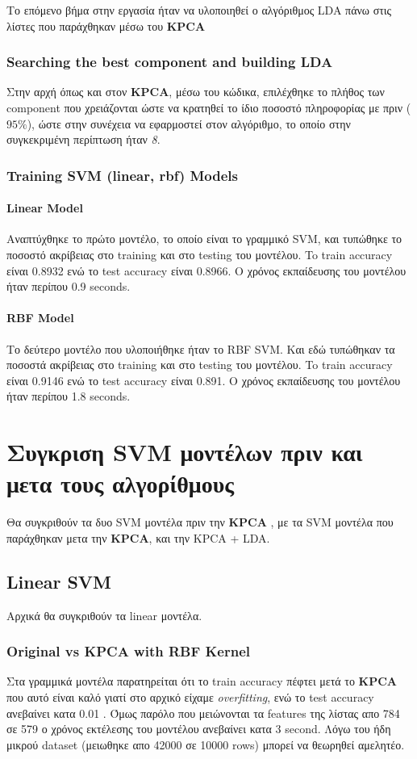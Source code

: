 Το επόμενο βήμα στην εργασία ήταν να υλοποιηθεί ο αλγόριθμος LDA πάνω στις λίστες που παράχθηκαν μέσω του \textbf{KPCA}
\subsubsection{Searching the best component  and building LDA  }

Στην αρχή όπως και στον \textbf{KPCA}, μέσω του κώδικα, επιλέχθηκε το πλήθος των component που χρειάζονται ώστε να κρατηθεί το ίδιο ποσοστό πληροφορίας με πριν ($95\%$), ώστε στην συνέχεια να εφαρμοστεί στον αλγόριθμο, το οποίο στην συγκεκριμένη περίπτωση ήταν \emph{8}.

\subsubsection{Training SVM (linear, rbf) Models}

\paragraph{Linear Model}

Αναπτύχθηκε το πρώτο μοντέλο, το οποίο είναι το γραμμικό SVM, και
τυπώθηκε το ποσοστό ακρίβειας στο training και στο testing του μοντέλου. To train accuracy είναι 0.8932 ενώ το test
accuracy είναι 0.8966. Ο χρόνος εκπαίδευσης του μοντέλου ήταν περίπου 0.9 seconds.

\paragraph{RBF Model}

Το δεύτερο μοντέλο που υλοποιήθηκε ήταν το RBF SVM. Και εδώ τυπώθηκαν τα ποσοστά
ακρίβειας στο training και στο testing του μοντέλου. To train accuracy είναι 0.9146 ενώ το test accuracy είναι 0.891. Ο χρόνος εκπαίδευσης του μοντέλου ήταν περίπου 1.8 seconds.

\newpage
\section{Συγκριση SVM μοντέλων πριν και μετα τους αλγορίθμους}
Θα συγκριθούν τα δυο SVM μοντέλα πριν την \textbf{KPCA} , με τα SVM μοντέλα που παράχθηκαν μετα την \textbf{KPCA}, και την KPCA + LDA. 
\subsection{Linear SVM}
Αρχικά θα συγκριθούν τα linear μοντέλα.
\subsubsection{Original vs KPCA with RBF Kernel}
Στα γραμμικά μοντέλα παρατηρείται ότι το train accuracy πέφτει μετά το \textbf{KPCA} που αυτό είναι καλό γιατί στο αρχικό είχαμε \emph{overfitting}, ενώ το test accuracy ανεβαίνει κατα 0.01 . Όμως παρόλο που μειώνονται τα features της λίστας απο 784 σε 579 ο χρόνος εκτέλεσης του μοντέλου ανεβαίνει κατα 3 second. Λόγω του ήδη μικρού dataset (μειωθηκε απο 42000 σε 10000 rows) μπορεί να θεωρηθεί αμελητέο.

